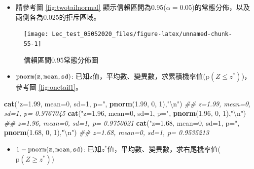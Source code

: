 \documentclass[hyperref,]{ctexart}
\newenvironment{Shaded}{\begin{snugshade}}{\end{snugshade}}
\newcommand{\CharTok}[1]{\textcolor[rgb]{0.31,0.60,0.02}{#1}}
\newcommand{\CommentTok}[1]{\textcolor[rgb]{0.56,0.35,0.01}{\textit{#1}}}
\newcommand{\DecValTok}[1]{\textcolor[rgb]{0.00,0.00,0.81}{#1}}
\newcommand{\FloatTok}[1]{\textcolor[rgb]{0.00,0.00,0.81}{#1}}
\newcommand{\KeywordTok}[1]{\textcolor[rgb]{0.13,0.29,0.53}{\textbf{#1}}}
\newcommand{\NormalTok}[1]{#1}
\newcommand{\StringTok}[1]{\textcolor[rgb]{0.31,0.60,0.02}{#1}}
\providecommand{\tightlist}{%
  \setlength{\itemsep}{0pt}\setlength{\parskip}{0pt}}
\begin{document}
\begin{itemize}
\tightlist
\item
  請參考圖 \ref{fig:twotailnormal}
  顯示信賴區間為0.95(\(\alpha=0.05\))的常態分佈，以及兩側各為0.025的拒斥區域。
\end{itemize}

\begin{figure}

\texttt{[image: Lec\_test\_05052020\_files/figure-latex/unnamed-chunk-55-1]} \hfill{}

\caption{\label{fig:twotailnormal}信賴區間0.95常態分佈圖}\label{fig:unnamed-chunk-55}
\end{figure}

\begin{itemize}
\tightlist
\item
  \(\tt{pnorm(z, mean, sd)}\):
  已知z值，平均數、變異數，求累積機率值(\(\text{p}(Z\leq z^{*})\))，參考圖
  \ref{fig:onetail1}。
\end{itemize}

\begin{Shaded}
\begin{Highlighting}[]
\KeywordTok{cat}\NormalTok{(}\StringTok{"z=1.99, mean=0, sd=1, p="}\NormalTok{, }\KeywordTok{pnorm}\NormalTok{(}\FloatTok{1.99}\NormalTok{, }\DecValTok{0}\NormalTok{, }\DecValTok{1}\NormalTok{),}\StringTok{"}\CharTok{\textbackslash{}n}\StringTok{"}\NormalTok{)}
\CommentTok{## z=1.99, mean=0, sd=1, p= 0.9767045}
\KeywordTok{cat}\NormalTok{(}\StringTok{"z=1.96, mean=0, sd=1, p="}\NormalTok{, }\KeywordTok{pnorm}\NormalTok{(}\FloatTok{1.96}\NormalTok{, }\DecValTok{0}\NormalTok{, }\DecValTok{1}\NormalTok{),}\StringTok{"}\CharTok{\textbackslash{}n}\StringTok{"}\NormalTok{)}
\CommentTok{## z=1.96, mean=0, sd=1, p= 0.9750021}
\KeywordTok{cat}\NormalTok{(}\StringTok{"z=1.68, mean=0, sd=1, p="}\NormalTok{, }\KeywordTok{pnorm}\NormalTok{(}\FloatTok{1.68}\NormalTok{, }\DecValTok{0}\NormalTok{, }\DecValTok{1}\NormalTok{),}\StringTok{"}\CharTok{\textbackslash{}n}\StringTok{"}\NormalTok{)}
\CommentTok{## z=1.68, mean=0, sd=1, p= 0.9535213}
\end{Highlighting}
\end{Shaded}

\begin{itemize}
\tightlist
\item
  \(1-\tt{pnorm(z, mean, sd)}\):
  已知\(z^{*}\)值，平均數、變異數，求右尾機率值(\(\text{p}(Z\geq z^{*})\))
\end{itemize}
\end{document}
